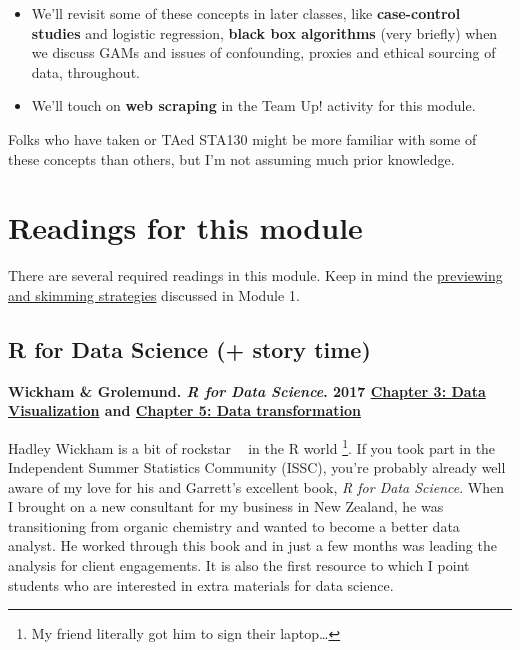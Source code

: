 \documentclass[
  openany]{book}
\providecommand{\tightlist}{%
  \setlength{\itemsep}{0pt}\setlength{\parskip}{0pt}}
\begin{document}
\begin{itemize}
\tightlist
\item
  We'll revisit some of these concepts in later classes, like \textbf{case-control studies} and logistic regression, \textbf{black box algorithms} (very briefly) when we discuss GAMs and issues of confounding, proxies and ethical sourcing of data, throughout.
\item
  We'll touch on \textbf{web scraping} in the Team Up! activity for this module.
\end{itemize}

Folks who have taken or TAed STA130 might be more familiar with some of these concepts than others, but I'm not assuming much prior knowledge.

\hypertarget{readings-for-this-module}{%
\section{Readings for this module}\label{readings-for-this-module}}

There are several required readings in this module. Keep in mind the \protect\hyperlink{previewskim}{previewing and skimming strategies} discussed in Module 1.

\hypertarget{r-for-data-science-story-time}{%
\subsection{R for Data Science (+ story time)}\label{r-for-data-science-story-time}}

\textbf{Wickham \& Grolemund. \emph{R for Data Science}. 2017 \href{https://r4ds.had.co.nz/data-visualisation.html}{Chapter 3: Data Visualization} and \href{https://r4ds.had.co.nz/transform.html}{Chapter 5: Data transformation}}

Hadley Wickham is a bit of rockstar 👨‍🎤 in the R world \footnote{My friend literally got him to sign their laptop\ldots{}}. If you took part in the Independent Summer Statistics Community (ISSC), you're probably already well aware of my love for his and Garrett's excellent book, \emph{R for Data Science}. When I brought on a new consultant for my business in New Zealand, he was transitioning from organic chemistry and wanted to become a better data analyst. He worked through this book and in just a few months was leading the analysis for client engagements. It is also the first resource to which I point students who are interested in extra materials for data science.
\end{document}
